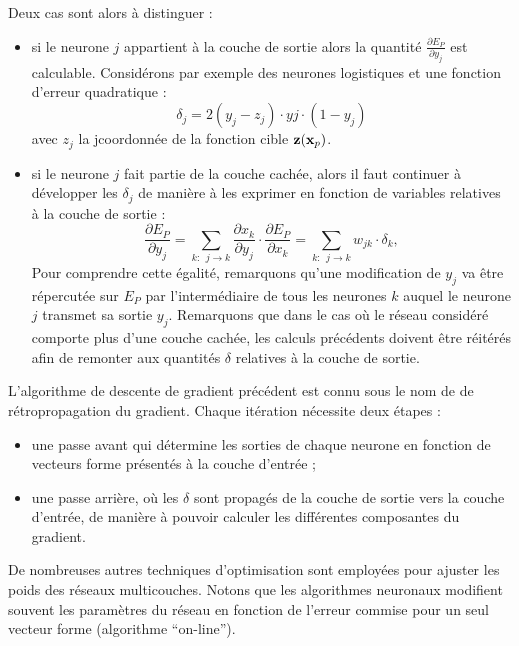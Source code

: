 Deux cas sont alors \`a distinguer :
\begin{itemize}
\item 
si le neurone $j$ appartient \`a la couche de sortie alors la quantit\'e
$\frac{\partial E_P}{\partial y_{j}}$ est calculable. Consid\'erons par exemple
des neurones logistiques et une fonction d'erreur  quadratique : 
$$
\delta_j=2(y_j-z_j) \cdot yj \cdot (1-y_j)
$$
avec $z_j$ la j\ieme coordonn\'ee de la fonction cible $\mbox{\bf z}(\mbox{\bf x}_p)$.
\item 
si le neurone $j$ fait partie de la couche cach\'ee, alors il faut continuer \`a
d\'evelopper les $\delta_j$ de mani\`ere \`a les exprimer en fonction
de variables relatives \`a la couche de sortie :
$$
\frac{\partial E_P}{\partial y_{j}}= \sum_{k : \  \ j \rightarrow k} \frac{\partial x_{k}}{\partial y_{j}} \cdot 
                                                               \frac{\partial E_P}{\partial x_{k}}
                                 =  \sum_{k : \  \ j \rightarrow k} w_{jk} \cdot \delta_k, 
$$
Pour comprendre cette \'egalit\'e, remarquons qu'une modification de $y_j$ va
 \^etre r\'epercut\'ee sur $E_P$ par l'interm\'ediaire
de tous les neurones $k$ auquel le neurone $j$ transmet sa sortie $y_j$.
Remarquons que dans le cas
o\`u le r\'eseau consid\'er\'e comporte plus d'une couche cach\'ee, les calculs pr\'ec\'edents
doivent \^ etre r\'eit\'er\'es afin de remonter aux quantit\'es
$\delta$ relatives \`a la couche de sortie.
\end{itemize}
L'algorithme de descente de gradient pr\'ec\'edent est connu sous le nom de 
de r\'etropropagation du gradient. Chaque it\'eration n\'ecessite deux \'etapes :
\begin{itemize}
\item une passe avant qui d\'etermine les sorties de chaque neurone en fonction
de vecteurs forme pr\'esent\'es \`a la couche d'entr\'ee ; 
\item une passe arri\`ere, o\`u les $\delta$ sont propag\'es de la couche de sortie vers 
la couche d'entr\'ee, de mani\`ere \`a pouvoir calculer les diff\'erentes composantes du 
gradient.
\end{itemize}
De nombreuses autres techniques d'optimisation sont employ\'ees
pour ajuster les poids des r\'eseaux multicouches. Notons que les algorithmes
neuronaux modifient souvent les param\`etres du r\'eseau en fonction de l'erreur 
commise pour un seul vecteur forme (algorithme ``on-line'').

